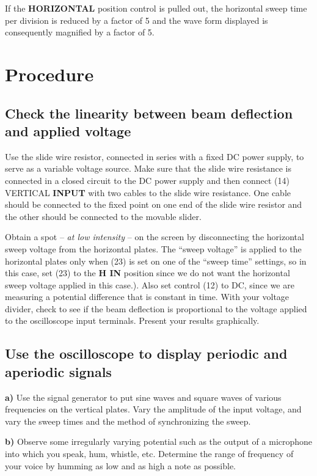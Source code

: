 \indent \indent If the \textbf{HORIZONTAL} position control is pulled out, the horizontal sweep time per division is reduced by a factor of 5 and the wave form displayed is consequently magnified by a factor of 5.

\newpage
\section{Procedure}

\subsection{Check the linearity between beam deflection and applied voltage}

Use the slide wire resistor, connected in series with a fixed DC power supply, to serve as a variable voltage source. Make sure that the slide wire resistance is connected in a closed circuit to the DC power supply and then connect (14) VERTICAL \textbf{INPUT} with two cables to the slide wire resistance. One cable should be connected to the fixed point on one end of the slide wire resistor and the other should be connected to the movable slider.\myskip

Obtain a spot -- \emph{at low intensity} -- on the screen by disconnecting the horizontal sweep voltage from the horizontal plates. The ``sweep voltage'' is applied to the horizontal plates only when (23) is set on one of the ``sweep time'' settings, so in this case, set (23) to the \textbf{H IN} position since we do not want the horizontal sweep voltage applied in this case.). Also set control (12) to DC, since we are measuring a potential difference that is constant in time. With your voltage divider, check to see if the beam deflection is proportional to the voltage applied to the oscilloscope input terminals. Present your results graphically.

\subsection{Use the oscilloscope to display periodic and aperiodic signals}

\textbf{a)} Use the signal generator to put sine waves and square waves of various frequencies on the vertical plates. Vary the amplitude of the input voltage, and vary the sweep times and the method of synchronizing the sweep.\myskip

\noindent\textbf{b)} Observe some irregularly varying potential such as the output of a microphone into which you speak, hum, whistle, etc. Determine the range of frequency of your voice by humming as low and as high a note as possible.\myskip

